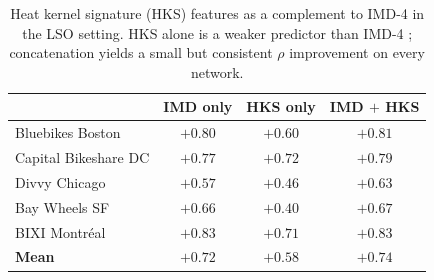 \begin{table}[H]
\centering
\caption{Heat kernel signature (HKS) features as a complement
to IMD-4 in the LSO setting.  HKS alone is a weaker
predictor than IMD-4 ; concatenation yields a small but
consistent $\rho$ improvement on every network.}
\label{tab:hks}
\small
\begin{tabular}{@{}lccc@{}}
\toprule
                       & IMD only & HKS only & IMD $+$ HKS \\
\midrule
Bluebikes Boston       & $+0.80$ & $+0.60$ & $\mathbf{+0.81}$ \\
Capital Bikeshare DC    & $+0.77$ & $+0.72$ & $\mathbf{+0.79}$ \\
Divvy Chicago          & $+0.57$ & $+0.46$ & $\mathbf{+0.63}$ \\
Bay Wheels SF          & $+0.66$ & $+0.40$ & $\mathbf{+0.67}$ \\
BIXI Montr\'eal         & $+0.83$ & $+0.71$ & $\mathbf{+0.83}$ \\
\midrule
\textbf{Mean}          & $+0.72$ & $+0.58$ & $\mathbf{+0.74}$ \\
\bottomrule
\end{tabular}
\end{table}

